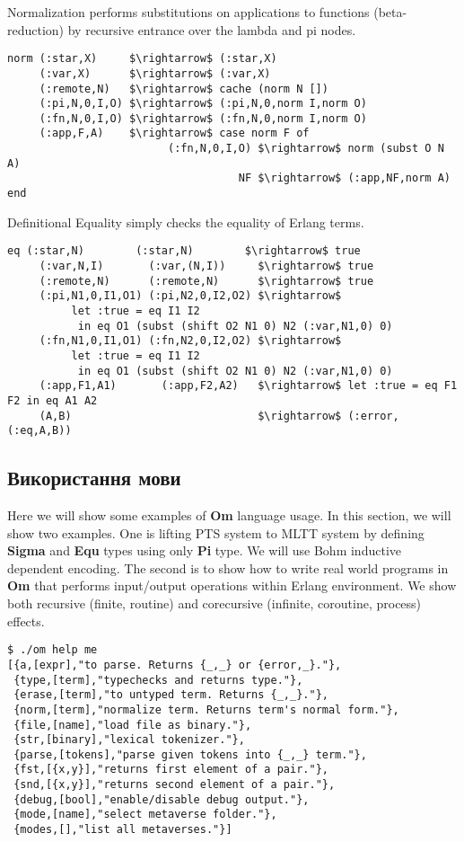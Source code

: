 \begin{definition}
\begin{definition}
\begin{definition}
\begin{definition}
Normalization performs substitutions on applications to functions (beta-reduction)
by recursive entrance over the lambda and pi nodes.

\begin{lstlisting}[mathescape=true]
norm (:star,X)     $\rightarrow$ (:star,X)
     (:var,X)      $\rightarrow$ (:var,X)
     (:remote,N)   $\rightarrow$ cache (norm N [])
     (:pi,N,0,I,O) $\rightarrow$ (:pi,N,0,norm I,norm O)
     (:fn,N,0,I,O) $\rightarrow$ (:fn,N,0,norm I,norm O)
     (:app,F,A)    $\rightarrow$ case norm F of
                         (:fn,N,0,I,O) $\rightarrow$ norm (subst O N A)
                                    NF $\rightarrow$ (:app,NF,norm A) end
\end{lstlisting}

Definitional Equality simply checks the equality of Erlang terms.

\begin{lstlisting}[mathescape=true]
  eq (:star,N)        (:star,N)        $\rightarrow$ true
     (:var,N,I)       (:var,(N,I))     $\rightarrow$ true
     (:remote,N)      (:remote,N)      $\rightarrow$ true
     (:pi,N1,0,I1,O1) (:pi,N2,0,I2,O2) $\rightarrow$
          let :true = eq I1 I2
           in eq O1 (subst (shift O2 N1 0) N2 (:var,N1,0) 0)
     (:fn,N1,0,I1,O1) (:fn,N2,0,I2,O2) $\rightarrow$
          let :true = eq I1 I2
           in eq O1 (subst (shift O2 N1 0) N2 (:var,N1,0) 0)
     (:app,F1,A1)       (:app,F2,A2)   $\rightarrow$ let :true = eq F1 F2 in eq A1 A2
     (A,B)                             $\rightarrow$ (:error,(:eq,A,B))
\end{lstlisting}

\subsection{Використання мови}
Here we will show some examples of {\bf Om} language usage.
In this section, we will show two examples.
One is lifting PTS system to MLTT system by defining {\bf Sigma} and {\bf Equ} types using only {\bf Pi} type.
We will use Bohm inductive dependent encoding\cite{Bohm85}.
The second is to show how to write real world programs in {\bf Om} that performs input/output operations within Erlang environment.
We show both recursive (finite, routine) and corecursive (infinite, coroutine, process) effects.

\begin{lstlisting}
$ ./om help me
[{a,[expr],"to parse. Returns {_,_} or {error,_}."},
 {type,[term],"typechecks and returns type."},
 {erase,[term],"to untyped term. Returns {_,_}."},
 {norm,[term],"normalize term. Returns term's normal form."},
 {file,[name],"load file as binary."},
 {str,[binary],"lexical tokenizer."},
 {parse,[tokens],"parse given tokens into {_,_} term."},
 {fst,[{x,y}],"returns first element of a pair."},
 {snd,[{x,y}],"returns second element of a pair."},
 {debug,[bool],"enable/disable debug output."},
 {mode,[name],"select metaverse folder."},
 {modes,[],"list all metaverses."}]


\end{lstlisting}
\end{definition}
\end{definition}
\end{definition}
\end{definition}

